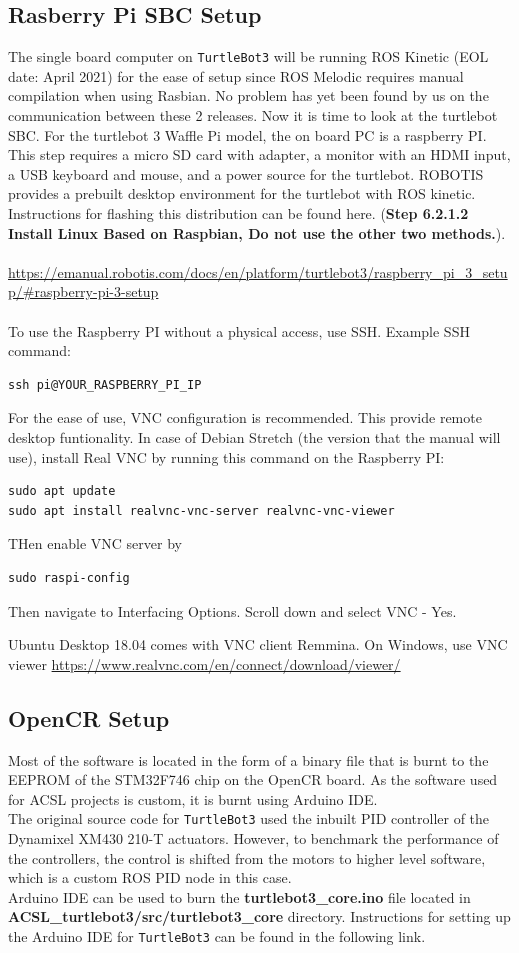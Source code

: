\documentclass[12]{article}
\begin{document}
\subsection{Rasberry Pi SBC Setup}
The single board computer on \texttt{TurtleBot3} will be running ROS Kinetic (EOL date: April 2021) for the ease of setup since ROS Melodic requires manual compilation when using Rasbian. 
No problem has yet been found by us on the communication between these 2 releases.
Now it is time to look at the turtlebot SBC. For the turtlebot 3 Waffle Pi model, the on board PC is a raspberry PI. 
This step requires a micro SD card with adapter, a monitor with an HDMI input, a USB keyboard and mouse, and a power source for the turtlebot. 
ROBOTIS provides a prebuilt desktop environment for the turtlebot with ROS kinetic. Instructions for flashing this distribution can be found here. (\textbf{Step 6.2.1.2 Install Linux Based on Raspbian, Do not use the other two methods.}).\\\\
\url {https://emanual.robotis.com/docs/en/platform/turtlebot3/raspberry_pi_3_setup/#raspberry-pi-3-setup}\\\\
To use the Raspberry PI without a physical access, use SSH. Example SSH command:
\begin{lstlisting}[style=bash]
ssh pi@YOUR_RASPBERRY_PI_IP
\end{lstlisting}
For the ease of use, VNC configuration is recommended. This provide remote desktop funtionality. In case of Debian Stretch (the version that the manual will use), install Real VNC by running this command on the Raspberry PI:
\begin{lstlisting}[style=bash]
sudo apt update
sudo apt install realvnc-vnc-server realvnc-vnc-viewer
\end{lstlisting}
THen enable VNC server by 
\begin{lstlisting}[style=bash]
sudo raspi-config
\end{lstlisting}
Then navigate to Interfacing Options.
Scroll down and select VNC - Yes.


Ubuntu Desktop 18.04 comes with VNC client Remmina.
On Windows, use VNC viewer
\url{https://www.realvnc.com/en/connect/download/viewer/}
\subsection{OpenCR Setup}
Most of the software is located in the form of a binary file that is burnt to the EEPROM of the STM32F746 chip on the OpenCR board. As the software used for ACSL projects is custom, it is burnt using Arduino IDE.\\
The original source code for \texttt{TurtleBot3} used the inbuilt PID controller of the Dynamixel XM430 210-T actuators. However, to benchmark the performance of the controllers, the control is shifted from the motors to higher level software, which is a custom ROS PID node in this case.\\
Arduino IDE can be used to burn the \textbf{turtlebot3\_core.ino} file located in \textbf{ACSL\_turtlebot3/src/turtlebot3\_core} directory. Instructions for setting up the Arduino IDE for \texttt{TurtleBot3} can be found in the following link.
\end{document}
